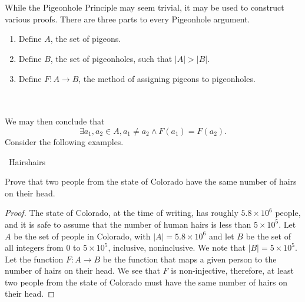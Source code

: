 \begin{center}
    \end{center}
    \vphantom
    \\
    \\
    While the Pigeonhole Principle may seem trivial, it may be used to construct various proofs. There are three parts to every Pigeonhole argument.
    \begin{enumerate}
        \item Define \(A\), the set of pigeons.
        \item Define \(B\), the set of pigeonholes, such that \(|A|>|B|\).
        \item Define \(F:A\to B\), the method of assigning pigeons to pigeonholes.
    \end{enumerate}
    \vphantom
    \\
    \\
    We may then conclude that
    \begin{equation*}
        \exists a_1,a_2\in A,a_1\neq a_2\wedge F(a_1)=F(a_2).
    \end{equation*}
    \pagebreak
    Consider the following examples.
    \begin{example}{\Difficulty\,\Difficulty\,\,Hairs}{hairs}
        
        Prove that two people from the state of Colorado have the same number of hairs on their head.
        \begin{proof}
            The state of Colorado, at the time of writing, has roughly \(5.8\times10^6\) people, and it is safe to assume that the number of human hairs is less than \(5\times10^5\). Let \(A\) be the set of people in Colorado, with \(|A|=5.8\times10^6\) and let \(B\) be the set of all integers from \(0\) to \(5\times10^5\), inclusive, noninclusive. We note that \(|B|=5\times10^5\). Let the function \(F:A\to B\) be the function that maps a given person to the number of hairs on their head. We see that \(F\) is non-injective, therefore, at least two people from the state of Colorado must have the same number of hairs on their head.
        \end{proof}
    
    \end{example}
